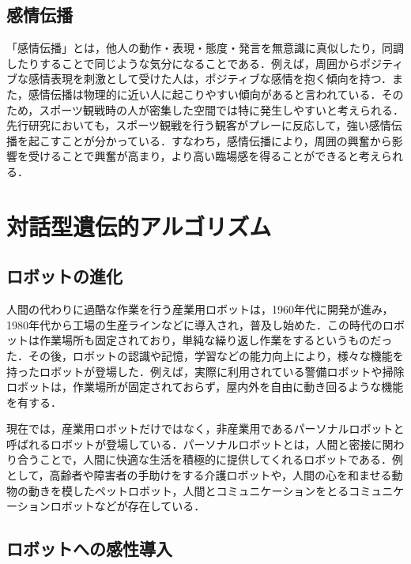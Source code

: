 \subsection{感情伝播}
\label{sec2.2.2}

「感情伝播」とは，他人の動作・表現・態度・発言を無意識に真似したり，同調したりすることで同じような気分になることである\cite{denpa}．例えば，周囲からポジティブな感情表現を刺激として受けた人は，ポジティブな感情を抱く傾向を持つ．また，感情伝播は物理的に近い人に起こりやすい傾向があると言われている．そのため，スポーツ観戦時の人が密集した空間では特に発生しやすいと考えられる．先行研究においても，スポーツ観戦を行う観客がプレーに反応して，強い感情伝播を起こすことが分かっている\cite{jyodo}．すなわち，感情伝播により，周囲の興奮から影響を受けることで興奮が高まり，より高い臨場感を得ることができると考えられる．

\newpage

\section{対話型遺伝的アルゴリズム}
\label{sec2.3}

\subsection{ロボットの進化}
\label{sec2.3.1}

人間の代わりに過酷な作業を行う産業用ロボットは，1960年代に開発が進み，1980年代から工場の生産ラインなどに導入され，普及し始めた．この時代のロボットは作業場所も固定されており，単純な繰り返し作業をするというものだった．その後，ロボットの認識や記憶，学習などの能力向上により，様々な機能を持ったロボットが登場した．例えば，実際に利用されている警備ロボットや掃除ロボットは，作業場所が固定されておらず，屋内外を自由に動き回るような機能を有する．

現在では，産業用ロボットだけではなく，非産業用であるパーソナルロボットと呼ばれるロボットが登場している．パーソナルロボットとは，人間と密接に関わり合うことで，人間に快適な生活を積極的に提供してくれるロボットである\cite{perso}．例として，高齢者や障害者の手助けをする介護ロボットや，人間の心を和ませる動物の動きを模したペットロボット，人間とコミュニケーションをとるコミュニケーションロボットなどが存在している．




\subsection{ロボットへの感性導入}
\label{sec2.3.2}

